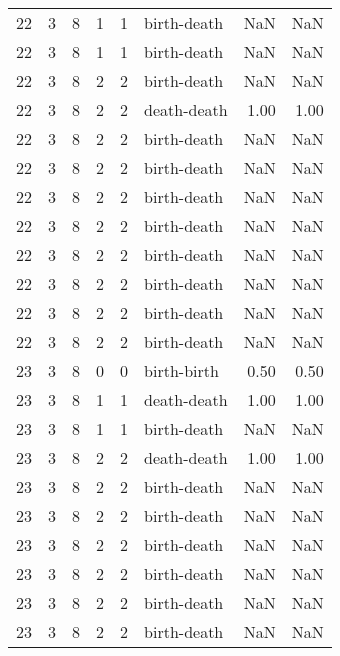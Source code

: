\documentclass{article}
\begin{document}
\begin{center}
\begin{tabular}{rrrrrlrr}
22 & 3 & 8 & 1 & 1 & birth-death & NaN & NaN \\
22 & 3 & 8 & 1 & 1 & birth-death & NaN & NaN \\
22 & 3 & 8 & 2 & 2 & birth-death & NaN & NaN \\
22 & 3 & 8 & 2 & 2 & death-death & 1.00 & 1.00 \\
22 & 3 & 8 & 2 & 2 & birth-death & NaN & NaN \\
22 & 3 & 8 & 2 & 2 & birth-death & NaN & NaN \\
22 & 3 & 8 & 2 & 2 & birth-death & NaN & NaN \\
22 & 3 & 8 & 2 & 2 & birth-death & NaN & NaN \\
22 & 3 & 8 & 2 & 2 & birth-death & NaN & NaN \\
22 & 3 & 8 & 2 & 2 & birth-death & NaN & NaN \\
22 & 3 & 8 & 2 & 2 & birth-death & NaN & NaN \\
22 & 3 & 8 & 2 & 2 & birth-death & NaN & NaN \\
23 & 3 & 8 & 0 & 0 & birth-birth & 0.50 & 0.50 \\
23 & 3 & 8 & 1 & 1 & death-death & 1.00 & 1.00 \\
23 & 3 & 8 & 1 & 1 & birth-death & NaN & NaN \\
23 & 3 & 8 & 2 & 2 & death-death & 1.00 & 1.00 \\
23 & 3 & 8 & 2 & 2 & birth-death & NaN & NaN \\
23 & 3 & 8 & 2 & 2 & birth-death & NaN & NaN \\
23 & 3 & 8 & 2 & 2 & birth-death & NaN & NaN \\
23 & 3 & 8 & 2 & 2 & birth-death & NaN & NaN \\
23 & 3 & 8 & 2 & 2 & birth-death & NaN & NaN \\
23 & 3 & 8 & 2 & 2 & birth-death & NaN & NaN \\
\bottomrule
\end{tabular}


\end{center}
\end{document}
